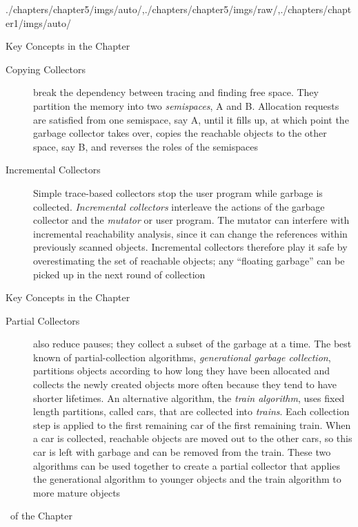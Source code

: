 \begin{graphicspathcontext}{{./chapters/chapter5/imgs/auto/},{./chapters/chapter5/imgs/raw/},{./chapters/chapter1/imgs/auto/}}
\begin{bibunit}[apalike]
\begin{frame}{{Key Concepts} in the Chapter \insertcontinuationtext}
	\begin{description}
		\item[Copying Collectors] break the dependency between tracing and finding free space. They partition the memory into two \emph{semispaces}, A and B. Allocation requests are satisfied from one semispace, say A, until it fills up, at which point the garbage collector takes over, copies the reachable objects to the other space, say B, and reverses the roles of the semispaces
		\item[Incremental Collectors] Simple trace-based collectors stop the user program while garbage is collected. \emph{Incremental collectors} interleave the actions of the garbage collector and the \emph{mutator} or user program. The mutator can interfere with incremental reachability analysis, since it can change the references within previously scanned objects. Incremental collectors therefore play it safe by overestimating the set of reachable objects; any ``floating garbage'' can be picked up in the next round of collection
	\end{description}
\end{frame}

\begin{frame}{{Key Concepts} in the Chapter \insertcontinuationtext}
	\begin{description}
		\item[Partial Collectors] also reduce pauses; they collect a subset of the garbage at a time. The best known of partial-collection algorithms, \emph{generational garbage collection}, partitions objects according to how long they have been allocated and collects the newly created objects more often because they tend to have shorter lifetimes. An alternative algorithm, the \emph{train algorithm}, uses fixed length partitions, called cars, that are collected into \emph{trains}. Each collection step is applied to the first remaining car of the first remaining train. When a car is collected, reachable objects are moved out to the other cars, so this car is left with garbage and can be removed from the train. These two algorithms can be used together to create a partial collector that applies the generational algorithm to younger objects and the train algorithm to more mature objects
	\end{description}
\end{frame}

\begin{frame}[t,fancyframetitle=false,allowframebreaks]{\bibname\ of the Chapter}%
	\tiny%
\end{frame}%

\end{bibunit}
\end{graphicspathcontext}

\endinput
